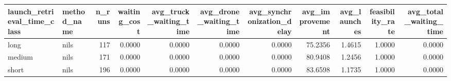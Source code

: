 \begin{tabular}{llrrrrrrrrr}
\toprule
launch_retrieval_time_class & method_name & n_runs & waiting_cost & avg_truck_waiting_time & avg_drone_waiting_time & avg_synchronization_delay & avg_improvement & avg_launches & feasibility_rate & avg_total_waiting_time \\
\midrule
long & nils & 117 & 0.0000 & 0.0000 & 0.0000 & 0.0000 & 75.2356 & 1.4615 & 1.0000 & 0.0000 \\
medium & nils & 171 & 0.0000 & 0.0000 & 0.0000 & 0.0000 & 80.9408 & 1.2456 & 1.0000 & 0.0000 \\
short & nils & 196 & 0.0000 & 0.0000 & 0.0000 & 0.0000 & 83.6598 & 1.1735 & 1.0000 & 0.0000 \\
\bottomrule
\end{tabular}
